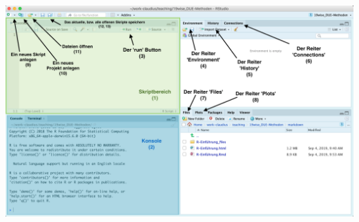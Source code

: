\documentclass[]{tufte-book}
\begin{document}
\begin{center}\includegraphics[width=1\linewidth]{figures/r-studio-light-marked} \end{center}
\end{document}
